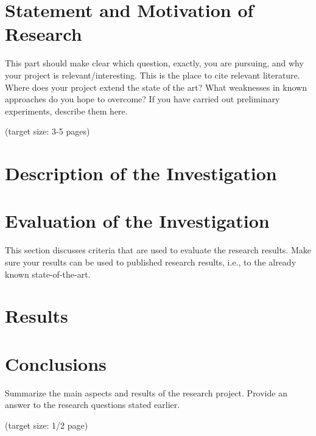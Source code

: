 \documentclass[a4paper,11pt,oneside]{article}
\begin{document}
  
  
  
  

  

  \newpage
  \tableofcontents

  \clearpage
  
  
  
  \section{Statement and Motivation of Research}

  This part should make clear which question, exactly, you are 
  pursuing, and why your project is relevant/interesting. This is the
  place to cite relevant literature. Where does your project extend
  the state of the art? What weaknesses in known approaches do you
  hope to overcome? If you have carried out preliminary experiments,
  describe them here.

  (target size: 3-5 pages)

 
  

  \section{Description of the Investigation}
  
  



  \section{Evaluation of the Investigation}

  This section discusses criteria that are used to evaluate the
  research results. Make sure your results can be used to published
  research results, i.e., to the already known state-of-the-art.
  
  \section{Results}
  



  \section{Conclusions}

  Summarize the main aspects and results of the research
  project. Provide an answer to the research questions stated earlier.

  (target size: 1/2 page)

  \nocite{JS06}

  \newpage
  
  
\end{document}
